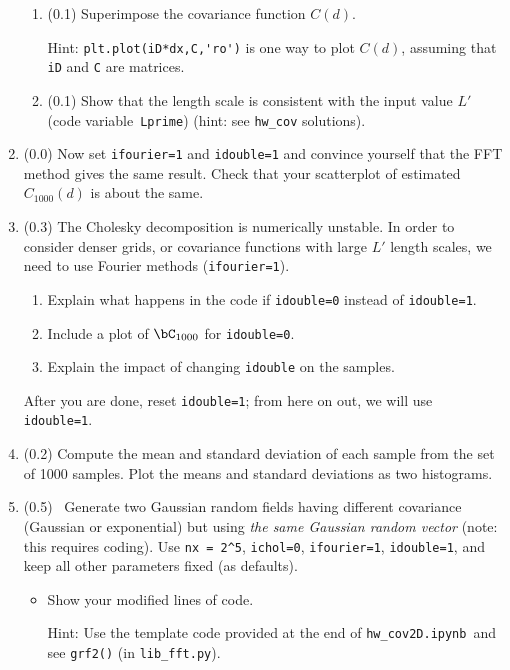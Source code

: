 \documentclass[11pt,titlepage,fleqn]{article}
\newcommand{\tfile}{{\tt hw\_cov2D.ipynb}}
\begin{document}
\begin{enumerate}
\begin{enumerate}
\item (0.1) Superimpose the covariance function $C(d)$.

Hint: \verb+plt.plot(iD*dx,C,'ro')+ is one way to plot $C(d)$, assuming that \verb+iD+ and \verb+C+ are matrices.

\item (0.1) Show that the length scale is consistent with the input value $L'$ (code variable~\verb+Lprime+) (hint: see \verb+hw_cov+ solutions).
\end{enumerate}

\item (0.0) Now set \verb+ifourier=1+ and \verb+idouble=1+ and convince yourself that the FFT method gives the same result. Check that your scatterplot of estimated $C_{1000}(d)$ is about the same.

\item (0.3) The Cholesky decomposition is numerically unstable. In order to consider denser grids, or covariance functions with large $L'$ length scales, we need to use Fourier methods (\verb+ifourier=1+).

\begin{enumerate}
\item Explain what happens in the code if \verb+idouble=0+ instead of \verb+idouble=1+.
\item Include a plot of $\bC_{1000}$ for \verb+idouble=0+.
\item Explain the impact of changing \verb+idouble+ on the samples.
\end{enumerate}
%
After you are done, reset \verb+idouble=1+; from here on out, we will use \verb+idouble=1+.

\item (0.2) Compute the mean and standard deviation of each sample from the set of 1000 samples. Plot the means and standard deviations as two histograms.

\item (0.5) \ptag\ Generate two Gaussian random fields having different covariance (Gaussian or exponential) but using {\em the same Gaussian random vector} (note: this requires coding). Use \verb+nx = 2^5+, \verb+ichol=0+, \verb+ifourier=1+, \verb+idouble=1+, and keep all other parameters fixed (as defaults).

\begin{itemize}
\item Show your modified lines of code.

Hint: Use the template code provided at the end of \tfile\ and see \verb+grf2()+ (in \verb+lib_fft.py+).


\end{itemize}
\end{enumerate}
\end{document}
